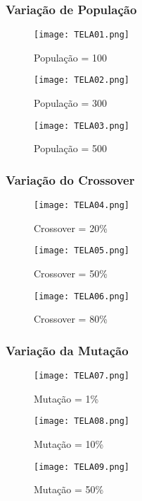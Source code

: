 \documentclass[12pt,a4paper]{article}
\begin{document}
\subsubsection{Variação de População}

\begin{figure}[!htb]
	\label{Figura 3}
	\centering
	\caption{População = 100}
	\texttt{[image: TELA01.png]}
\end{figure}

\newpage
\thispagestyle{main}
\begin{figure}[!htb]
	\label{Figura 4}
	\centering
	\caption{População = 300}
	\texttt{[image: TELA02.png]}
\end{figure}
\begin{figure}[!htb]
	\label{Figura 5}
	\centering
	\caption{População = 500}
	\texttt{[image: TELA03.png]}
\end{figure}

\newpage
\thispagestyle{main}
\subsubsection{Variação do Crossover}

\begin{figure}[!htb]
	\label{Figura 6}
	\centering
	\caption{Crossover = 20\%}
	\texttt{[image: TELA04.png]}
\end{figure}
\begin{figure}[!htb]
	\label{Figura 7}
	\centering
	\caption{Crossover = 50\%}
	\texttt{[image: TELA05.png]}
\end{figure}
\begin{figure}[!htb]
	\label{Figura 8}
	\centering
	\caption{Crossover = 80\%}
	\texttt{[image: TELA06.png]}
\end{figure}

\subsubsection{Variação da Mutação}

\begin{figure}[!htb]
	\label{Figura 6}
	\centering
	\caption{Mutação = 1\%}
	\texttt{[image: TELA07.png]}
\end{figure}
\begin{figure}[!htb]
	\label{Figura 7}
	\centering
	\caption{Mutação = 10\%}
	\texttt{[image: TELA08.png]}
\end{figure}
\begin{figure}[!htb]
	\label{Figura 8}
	\centering
	\caption{Mutação = 50\%}
	\texttt{[image: TELA09.png]}
\end{figure}
\end{document}
